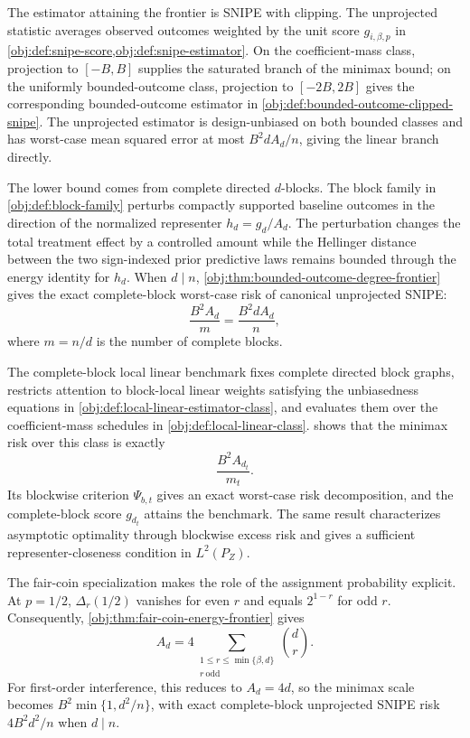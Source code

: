 The estimator attaining the frontier is SNIPE with clipping. The unprojected statistic averages observed outcomes weighted by the unit score \(g_{i,\beta,p}\) in \cref{obj:def:snipe-score,obj:def:snipe-estimator}. On the coefficient-mass class, projection to \([-B,B]\) supplies the saturated branch of the minimax bound; on the uniformly bounded-outcome class, projection to \([-2B,2B]\) gives the corresponding bounded-outcome estimator in \cref{obj:def:bounded-outcome-clipped-snipe}. The unprojected estimator is design-unbiased on both bounded classes and has worst-case mean squared error at most \(B^2dA_d/n\), giving the linear branch directly.

The lower bound comes from complete directed \(d\)-blocks. The block family in \cref{obj:def:block-family} perturbs compactly supported baseline outcomes in the direction of the normalized representer \(h_d=g_d/A_d\). The perturbation changes the total treatment effect by a controlled amount while the Hellinger distance between the two sign-indexed prior predictive laws remains bounded through the energy identity for \(h_d\). When \(d\mid n\), \cref{obj:thm:bounded-outcome-degree-frontier} gives the exact complete-block worst-case risk of canonical unprojected SNIPE:
\[
\frac{B^2A_d}{m}
=
\frac{B^2dA_d}{n},
\]
where \(m=n/d\) is the number of complete blocks.

The complete-block local linear benchmark fixes complete directed block graphs, restricts attention to block-local linear weights satisfying the unbiasedness equations in \cref{obj:def:local-linear-estimator-class}, and evaluates them over the coefficient-mass schedules in \cref{obj:def:local-linear-class}.  shows that the minimax risk over this class is exactly
\[
\frac{B^2A_{d_t}}{m_t}.
\]
Its blockwise criterion \(\Psi_{b,t}\) gives an exact worst-case risk decomposition, and the complete-block score \(g_{d_t}\) attains the benchmark. The same result characterizes asymptotic optimality through blockwise excess risk and gives a sufficient representer-closeness condition in \(L^2(P_Z)\).

The fair-coin specialization makes the role of the assignment probability explicit. At \(p=1/2\), \(\Delta_r(1/2)\) vanishes for even \(r\) and equals \(2^{1-r}\) for odd \(r\). Consequently, \cref{obj:thm:fair-coin-energy-frontier} gives
\[
A_d
=
4\sum_{\substack{1\le r\le \min\{\beta,d\}\\ r\ \mathrm{odd}}}\binom dr .
\]
For first-order interference, this reduces to \(A_d=4d\), so the minimax scale becomes \(B^2\min\{1,d^2/n\}\), with exact complete-block unprojected SNIPE risk \(4B^2d^2/n\) when \(d\mid n\).

